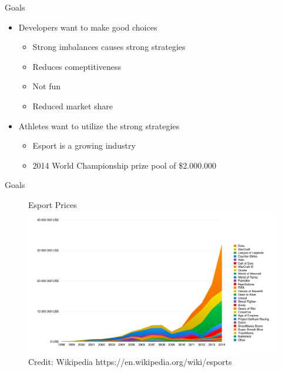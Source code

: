 \begin{frame}{Goals}
	\begin{itemize}
		\item Developers want to make good choices
			\begin{itemize}
			\item Strong imbalances causes strong strategies
			\item Reduces comeptitiveness
			\item Not fun
			\item Reduced market share 
			\end{itemize}
		
	\end{itemize}

	\begin{itemize}
		\item Athletes want to utilize the strong strategies
		\begin{itemize}
			\item Esport is a growing industry
			\item 2014 World Championship prize pool of \$2.000.000
		\end{itemize}
	\end{itemize}
	
\end{frame}

\begin{frame}{Goals}
	\begin{figure}[h!]
	  \centering
	  Esport Prices\\
	    \includegraphics[height=0.6\textwidth]{images/esport_prize.png}\\  
	     \tiny Credit: Wikipedia https://en.wikipedia.org/wiki/esports
\end{figure}

\end{frame}


